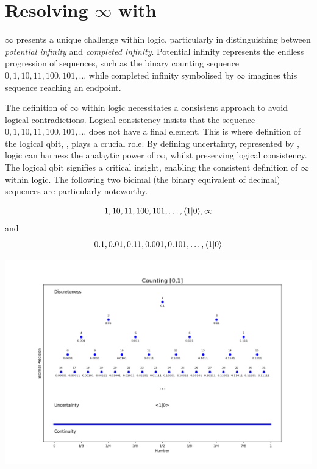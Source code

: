\documentclass[12pt]{article}
\begin{document}
\section*{Resolving $\infty$ with \qbit{}}

$\infty$ presents a unique challenge within logic, particularly in distinguishing between \textit{potential infinity} and \textit{completed infinity}. Potential infinity represents the endless progression of sequences, such as the binary counting sequence $0, 1, 10, 11, 100, 101, \ldots$ while completed infinity symbolised by $\infty$ imagines this sequence reaching an endpoint.

The definition of $\infty$ within logic necessitates a consistent approach to avoid logical contradictions. Logical consistency insists that the sequence $0, 1, 10, 11, 100, 101, \ldots$ does not have a final element. This is where definition of the logical qbit, \qbit{}, plays a crucial role. By defining uncertainty, represented by \qbit{}, logic can harness the analaytic power of $\infty$, whilst preserving logical consistency. The logical qbit signifies a critical insight, enabling the consistent definition of $\infty$ within logic. The following two bicimal (the binary equivalent of decimal) sequences are particularly noteworthy.

\begin{equation}
    1, 10, 11, 100, 101, \ldots, \langle 1 | 0 \rangle{}, \infty
\end{equation}
and
\begin{equation}
    0.1, 0.01, 0.11, 0.001, 0.101, \ldots, \langle 1 | 0 \rangle{}
\end{equation}

\includegraphics[width=\textwidth]{continuity.png}
\end{document}
